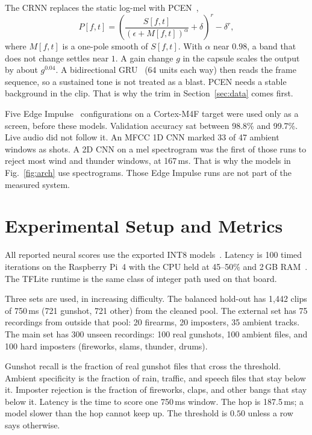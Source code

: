 \documentclass[conference]{IEEEtran}
\begin{document}
The CRNN replaces the static log-mel with PCEN~\cite{lostanlen2019,lostanlen2019taslp},
\begin{equation}
    P[f,t] = \left( \frac{S[f,t]}{(\epsilon + M[f,t])^{\alpha}} + \delta \right)^{r} - \delta^{r},
    \label{eq:pcen}
\end{equation}
where $M[f,t]$ is a one-pole smooth of $S[f,t]$. With $\alpha$ near $0.98$, a band that does not change settles near $1$. A gain change $g$ in the capsule scales the output by about $g^{0.04}$. A bidirectional GRU~\cite{cho2014} (64 units each way) then reads the frame sequence, so a sustained tone is not treated as a blast. PCEN needs a stable background in the clip. That is why the trim in Section~\ref{sec:data} comes first.

Five Edge Impulse~\cite{edgeimpulse2024} configurations on a Cortex-M4F target were used only as a screen, before these models. Validation accuracy sat between 98.8\% and 99.7\%. Live audio did not follow it. An MFCC 1D CNN marked 33 of 47 ambient windows as shots. A 2D CNN on a mel spectrogram was the first of those runs to reject most wind and thunder windows, at 167\,ms. That is why the models in Fig.~\ref{fig:arch} use spectrograms. Those Edge Impulse runs are not part of the measured system.

\section{Experimental Setup and Metrics}
\label{sec:setup}

All reported neural scores use the exported INT8 models~\cite{david2021}. Latency is 100 timed iterations on the Raspberry Pi~4 with the CPU held at 45--50\% and 2\,GB RAM~\cite{banbury2021}. The TFLite runtime is the same class of integer path used on that board.

Three sets are used, in increasing difficulty. The balanced hold-out has 1{,}442 clips of 750\,ms (721 gunshot, 721 other) from the cleaned pool. The external set has 75 recordings from outside that pool: 20 firearms, 20 imposters, 35 ambient tracks. The main set has 300 unseen recordings: 100 real gunshots, 100 ambient files, and 100 hard imposters (fireworks, slams, thunder, drums).

Gunshot recall is the fraction of real gunshot files that cross the threshold. Ambient specificity is the fraction of rain, traffic, and speech files that stay below it. Imposter rejection is the fraction of fireworks, claps, and other bangs that stay below it. Latency is the time to score one 750\,ms window. The hop is 187.5\,ms; a model slower than the hop cannot keep up. The threshold is $0.50$ unless a row says otherwise.
\end{document}

